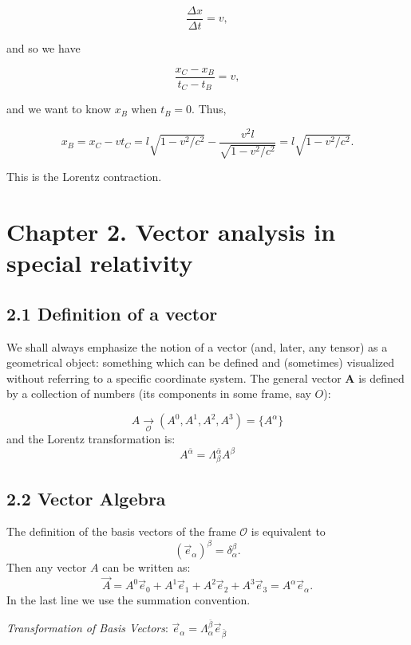 \documentclass[12pt]{book}
\begin{document}
        \[
        \frac{\Delta x}{\Delta t} = v,
        \]
        
        and so we have
        
        \[
        \frac{x_C - x_B}{t_C - t_B} = v,
        \]
        
        and we want to know \( x_B \) when \( t_B = 0 \). Thus,
        
        \[
        x_B = x_C - vt_C = l \sqrt{1 - v^2/c^2} - \frac{v^2l}{\sqrt{1 - v^2/c^2}} = l \sqrt{1 - v^2/c^2}.
        \]
        
        This is the Lorentz contraction.
                
\section{Chapter 2. Vector analysis in special relativity}

    \subsection{2.1 Definition of a vector}

        We shall always emphasize the notion of a vector (and, later, any tensor) as a geometrical object: something which can be defined and (sometimes) visualized without referring to a specific coordinate system.
        The general vector \( \mathbf{A} \) is defined by a collection of numbers (its components in some frame, say \( O \)):

        \[
        A \underset{\mathcal{O}}{\rightarrow} (A^0, A^1, A^2, A^3) = \{A^\alpha\} 
        \]
        and the Lorentz transformation is:
        \[
            A^{\bar{\alpha}}=\Lambda^{\bar{\alpha}}_\beta A^\beta
        \]
    
    \subsection{2.2 Vector Algebra}

        The definition of the basis vectors of the frame \( \mathcal{O} \) is equivalent to
        \[
        (\vec{e}_\alpha)^\beta = \delta_\alpha^\beta.
        \]
        Then any vector \(A\) can be written as:
        \[
        \vec{A}= A^0 \vec{e}_0 + A^1 \vec{e}_1 + A^2 \vec{e}_2 + A^3 \vec{e}_3 = A^\alpha \vec{e}_\alpha.
        \]
        In the last line we use the summation convention.
    
        \textit{Transformation of Basis Vectors}: \quad \( \vec{e}_\alpha=\Lambda^{\bar{\beta}}_\alpha \vec{e}_{\bar{\beta}}\)
\end{document}
